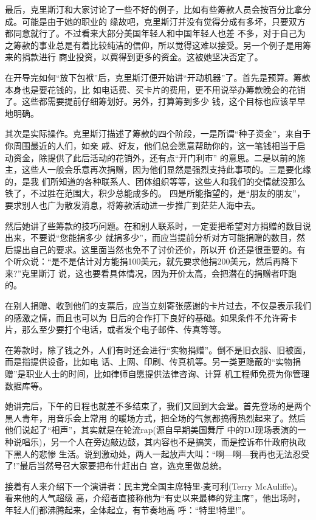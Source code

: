 ﻿\documentclass[11pt]{article}
\begin{document}
最后，克里斯汀和大家讨论了一些不好的例子，比如有些筹款人员会按百分比拿分成。可能是由于她的职业的
缘故吧，克里斯汀并没有觉得分成有多坏，只要双方都同意就行了。不过看来大部分美国年轻人和中国年轻人也差
不多，对于自己为之筹款的事业总是有着比较纯洁的信仰，所以觉得这难以接受。另一个例子是用筹来的捐款进行
商业投资，以冀得到更多的资金。这被她坚决否定了。

在开导完如何``放下包袱''后，克里斯汀便开始讲``开动机器''了。首先是预算。筹款本身也是要花钱的，比
如电话费、买卡片的费用，更不用说举办筹款晚会的花销了。这些都需要提前仔细筹划好。另外，打算筹到多少
钱，这个目标也应该早早地明确。

其次是实际操作。克里斯汀描述了筹款的四个阶段，一是所谓``种子资金''，来自于你周围最近的人们，如亲
戚、好友，他们总会愿意帮助你的，这一笔钱相当于启动资金，除提供了此后活动的花销外，还有点``开门利市''
的意思。二是以前的施主，这些人一般会乐意再次捐赠，因为他们显然是强烈支持此事项的。三是要化缘的，是我
们所知道的各种联系人、团体组织等等，这些人和我们的交情就没那么铁了，不过胜在范围大，积少总能成多的。
四是所能指望的，是``朋友的朋友''，要求别人也广为散发消息，将筹款活动进一步推广到茫茫人海中去。

然后她讲了些筹款的技巧问题。在和别人联系时，一定要把希望对方捐赠的数目说出来，不要说``您能捐多少
就捐多少''，而应当提前分析对方可能捐赠的数目，然后提出自己的要求。这里面当然也免不了讨价还价，所以开
价还是很重要的。有个听众说：``是不是估计对方能捐100美元，就先要求他捐200美元，然后再降下来?''克里斯汀
说，这也要看具体情况，因为开价太高，会把潜在的捐赠者吓跑的。

在别人捐赠、收到他们的支票后，应当立刻寄张感谢的卡片过去，不仅是表示我们的感激之情，而且也可以为
日后的合作打下良好的基础。如果条件不允许寄卡片，那么至少要打个电话，或者发个电子邮件、传真等等。

在筹款时，除了钱之外，人们有时还会进行``实物捐赠''。倒不是旧衣服、旧被面，而是指提供设备，比如电
话、上网、印刷、传真机等。另一类更隐蔽的``实物捐赠''是职业人士的时间，比如律师自愿提供法律咨询、计算
机工程师免费为你管理数据库等。

她讲完后，下午的日程也就差不多结束了，我们又回到大会堂。首先登场的是两个黑人青年，用音乐会上常用
的暖场方式，把全场的气氛都搞得热烈起来了。然后他们说起了``相声''，其实就是在轮流rap(源自早期美国舞厅
中的DJ现场表演的一种说唱乐)，另一个人在旁边敲边鼓，其内容也不是搞笑，而是控诉布什政府执政下黑人的悲惨
生活。说到激动处，两人一起放声大叫：``啊---啊---我再也无法忍受了!''最后当然号召大家要把布什赶出白
宫，选克里做总统。

接着有人来介绍下一个演讲者：民主党全国主席特里$\cdot$麦可利(Terry McAuliffe)。看来他的人气超级
高，介绍者直接称他为``有史以来最棒的党主席''，他出场时，年轻人们都沸腾起来，全体起立，有节奏地高
呼：``特里!特里!''。
\end{document}
